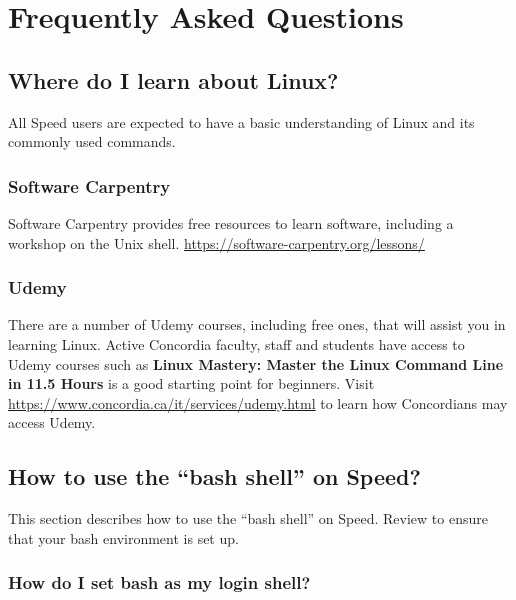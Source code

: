 \documentclass{easychair}
\begin{document}
\section{Frequently Asked Questions}
\label{sect:faqs}

\subsection{Where do I learn about Linux?}

All Speed users are expected to have a basic understanding of Linux and its commonly used commands.

\subsubsection*{Software Carpentry}

Software Carpentry provides free resources to learn software, including a workshop on the Unix shell.
\url{https://software-carpentry.org/lessons/} 

\subsubsection*{Udemy}

There are a number of Udemy courses, including free ones, that will assist 
you in learning Linux. Active Concordia faculty, staff and students have 
access to Udemy courses such as \textbf{Linux Mastery: Master the Linux 
Command Line in 11.5 Hours} is a good starting point for beginners. Visit
\url{https://www.concordia.ca/it/services/udemy.html} to learn how Concordians 
may access Udemy.

\subsection{How to use the ``bash shell'' on Speed?}

This section describes how to use the ``bash shell'' on Speed. Review
 to ensure that your bash environment is set up.

\subsubsection{How do I set bash as my login shell?}
\end{document}
